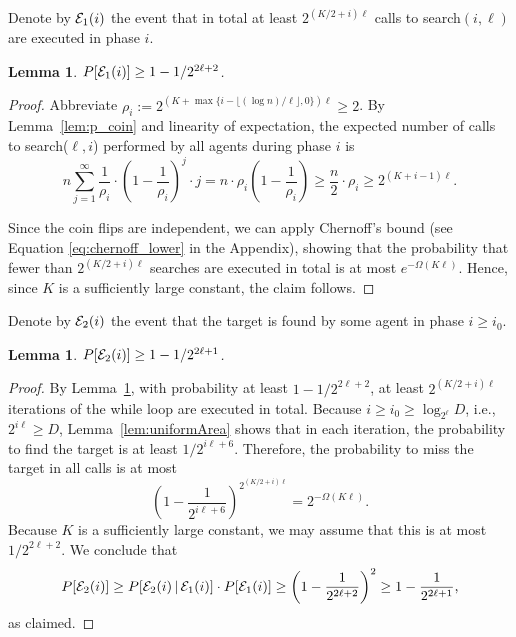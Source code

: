 \documentclass[11pt]{article}
\newtheorem{lemma}[theorem]{Lemma}
\begin{document}
Denote by ${\cal E}_1(i)$ the event that in total at least $2^{(K/2+i)\ell}$ calls to search$(i,\ell)$ are executed in phase $i$.

\begin{lemma}
\label{lem:whileLoop}
	$P[{\cal E}_1(i)]\geq 1-1/2^{2\ell+2}$.
\end{lemma}
\begin{proof}
Abbreviate $\rho_i :=2^{(K + \max\{i-\lfloor (\log n)/\ell\rfloor,0\})\ell}\geq 2$. By Lemma~\ref{lem:p_coin} and linearity of expectation, the expected number of calls to search($\ell,i$) performed by all agents during phase $i$ is
\begin{equation*}
n\sum_{j=1}^{\infty}\frac{1}{\rho_i}\cdot\left(1-\frac{1}{\rho_i}\right)^j\cdot j
= n\cdot \rho_i \left(1-\frac{1}{\rho_i}\right)\geq  \frac{n}{2}\cdot \rho_i
\geq 2^{(K + i-1)\ell}.
\end{equation*}

Since the coin flips are independent, we can apply Chernoff's bound (see Equation \eqref{eq:chernoff_lower} in the Appendix), showing that the probability that fewer than $2^{(K/2 + i)\ell}$ searches are executed in total is at most $e^{-\Omega(K\ell)}$. Hence, since $K$ is a sufficiently large constant, the claim follows.
\end{proof}

Denote by ${\cal E}_2(i)$ the event that the target is found by some agent in phase $i\geq  i_0$.

\begin{lemma}
\label{lem:probFind}
	 $P[{\cal E}_2(i)]\geq 1-1/2^{2\ell+1}$.
\end{lemma}
\begin{proof}
By Lemma~\ref{lem:whileLoop}, with probability at least $1-1/2^{2\ell+2}$, at least $2^{(K/2+i)\ell}$ iterations of the while loop are executed in total. Because $i\geq i_0\geq \log_{2^\ell}D$, i.e., $2^{i\ell}\geq D$, Lemma~\ref{lem:uniformArea} shows that in each iteration, the probability to find the target is at least $1/2^{i\ell+6}$. Therefore, the probability to miss the target in all calls is at most
\begin{equation*}
\left(1-\frac{1}{2^{i\ell+6}}\right)^{2^{(K/2+i)\ell}}=2^{-\Omega(K\ell)}.
\end{equation*}
Because $K$ is a sufficiently large constant, we may assume that this is at most $1/2^{2\ell+2}$. We conclude that
\begin{equation*}
P[{\cal E}_2(i)]\geq P[{\cal E}_2(i)\,|\,{\cal E}_1(i)]\cdot P[{\cal E}_1(i)]\geq \left(1-\frac{1}{2^{2\ell+2}}\right)^2\geq 1-\frac{1}{2^{2\ell+1}},
\end{equation*}
as claimed.
\end{proof}
\end{document}

